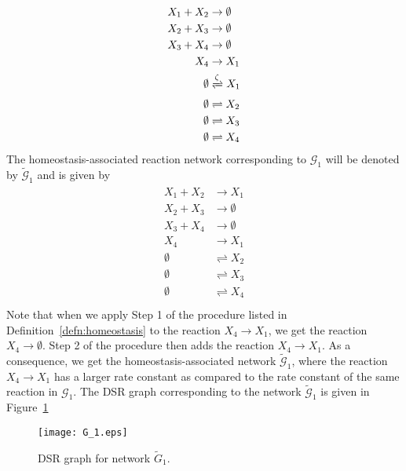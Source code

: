 \documentclass[11pt]{article}
\theoremstyle{plain}
\theoremstyle{definition}
\theoremstyle{remark}
\begin{document}
\begin{eqnarray}
\begin{split}
X_1 + X_2 &\rightarrow \emptyset \\
X_2 + X_3 &\rightarrow \emptyset \\
X_3 + X_4 &\rightarrow  \emptyset\\
X_4 &\rightarrow X_1 \\
\emptyset &\xrightleftharpoons[]{\zeta} X_1 \\
\emptyset &\rightleftharpoons X_2 \\
\emptyset &\rightleftharpoons X_3 \\
\emptyset &\rightleftharpoons X_4 \\
\end{split}
\end{eqnarray}
%
The homeostasis-associated reaction network corresponding to $\mathcal{G}_1$ will be denoted by $\tilde{\mathcal{G}}_1$ and is given by
\begin{eqnarray}
\begin{split}
X_1 + X_2 &\rightarrow X_1 \\
X_2 + X_3 &\rightarrow \emptyset \\
X_3 + X_4 &\rightarrow  \emptyset\\
X_4 &\rightarrow X_1 \\
\emptyset &\rightleftharpoons X_2 \\
\emptyset &\rightleftharpoons X_3 \\
\emptyset &\rightleftharpoons X_4 \\
\end{split}
\end{eqnarray}
%
Note that when we apply Step 1 of the procedure listed in Definition~\ref{defn:homeostasis} to the reaction $X_4 \rightarrow X_1$, we get the reaction $X_4 \rightarrow \emptyset$. Step 2 of the procedure then adds the reaction $X_4 \rightarrow X_1$. As a consequence, we get the homeostasis-associated network $\tilde{\mathcal{G}}_1$, where the reaction $X_4 \rightarrow X_1$ has a larger rate constant as compared to the rate constant of the same reaction in $\mathcal{G}_1$. The DSR graph corresponding to the network $\tilde{\mathcal{G}}_1$ is given in Figure~\ref{fig:DSR_graph_1}
\begin{figure}[h!]
\centering
\texttt{[image: G\_1.eps]}
\caption{DSR graph for network $\tilde{G}_1$.}
\label{fig:DSR_graph_1}
\end{figure}
%
\end{document}
